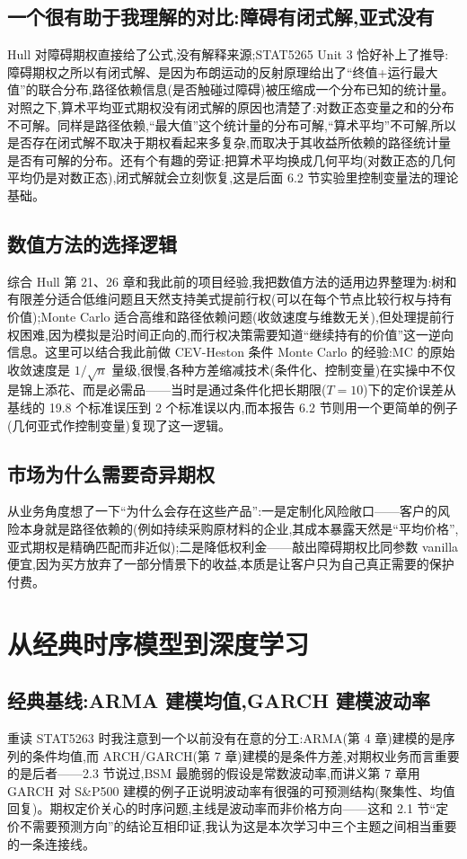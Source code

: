\documentclass[11pt]{ctexart}
\begin{document}
\subsection{一个很有助于我理解的对比:障碍有闭式解,亚式没有}
Hull 对障碍期权直接给了公式,没有解释来源;STAT5265 Unit 3 恰好补上了推导:障碍期权之所以有闭式解、是因为布朗运动的反射原理给出了``终值+运行最大值''的联合分布,路径依赖信息(是否触碰过障碍)被压缩成一个分布已知的统计量。对照之下,算术平均亚式期权没有闭式解的原因也清楚了:对数正态变量之和的分布不可解。同样是路径依赖,``最大值''这个统计量的分布可解,``算术平均''不可解,所以是否存在闭式解不取决于期权看起来多复杂,而取决于其收益所依赖的路径统计量是否有可解的分布。还有个有趣的旁证:把算术平均换成几何平均(对数正态的几何平均仍是对数正态),闭式解就会立刻恢复,这是后面 6.2 节实验里控制变量法的理论基础。

\subsection{数值方法的选择逻辑}
综合 Hull 第 21、26 章和我此前的项目经验,我把数值方法的适用边界整理为:树和有限差分适合低维问题且天然支持美式提前行权(可以在每个节点比较行权与持有价值);Monte Carlo 适合高维和路径依赖问题(收敛速度与维数无关),但处理提前行权困难,因为模拟是沿时间正向的,而行权决策需要知道``继续持有的价值''这一逆向信息。这里可以结合我此前做 CEV-Heston 条件 Monte Carlo 的经验:MC 的原始收敛速度是 $1/\sqrt{n}$ 量级,很慢,各种方差缩减技术(条件化、控制变量)在实操中不仅是锦上添花、而是必需品——当时是通过条件化把长期限($T=10$)下的定价误差从基线的 19.8 个标准误压到 2 个标准误以内,而本报告 6.2 节则用一个更简单的例子(几何亚式作控制变量)复现了这一逻辑。

\subsection{市场为什么需要奇异期权}
从业务角度想了一下``为什么会存在这些产品'':一是定制化风险敞口——客户的风险本身就是路径依赖的(例如持续采购原材料的企业,其成本暴露天然是``平均价格'',亚式期权是精确匹配而非近似);二是降低权利金——敲出障碍期权比同参数 vanilla 便宜,因为买方放弃了一部分情景下的收益,本质是让客户只为自己真正需要的保护付费。

\section{从经典时序模型到深度学习}

\subsection{经典基线:ARMA 建模均值,GARCH 建模波动率}
重读 STAT5263 时我注意到一个以前没有在意的分工:ARMA(第 4 章)建模的是序列的条件均值,而 ARCH/GARCH(第 7 章)建模的是条件方差,对期权业务而言重要的是后者——2.3 节说过,BSM 最脆弱的假设是常数波动率,而讲义第 7 章用 GARCH 对 S\&P500 建模的例子正说明波动率有很强的可预测结构(聚集性、均值回复)。期权定价关心的时序问题,主线是波动率而非价格方向——这和 2.1 节``定价不需要预测方向''的结论互相印证,我认为这是本次学习中三个主题之间相当重要的一条连接线。
\end{document}
